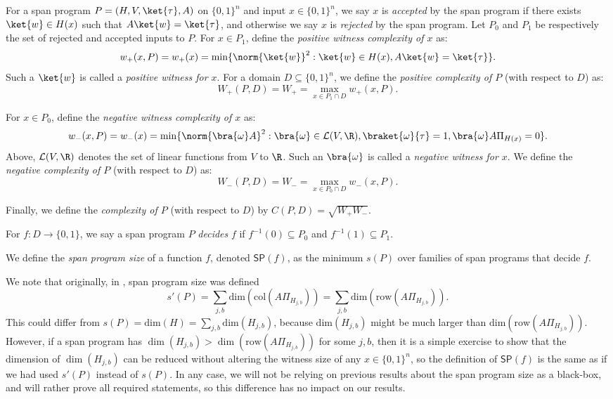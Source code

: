\documentclass{toc}
\begin{document}
\begin{definition}\label{def:witness}
For a span program $P=(H,V,\ket{\tau},A)$ on $\{0,1\}^n$ and input $x\in\{0,1\}^n$, 
we say $x$ is \emph{accepted} by the span program if there exists $\ket{w}\in H(x)$ such that $A\ket{w}=\ket{\tau}$, and otherwise we say $x$ is \emph{rejected} by the span program. Let $P_0$ and $P_1$ be respectively the set of rejected and accepted inputs to $P$. For $x\in P_1$, define the \emph{positive witness complexity of $x$} as:
$$w_+(x,P)=w_+(x)=\min\{\norm{\ket{w}}^2:\ket{w}\in H(x), A\ket{w}=\ket{\tau}\}.$$
Such a $\ket{w}$ is called a \emph{positive witness for $x$}. For a domain $D\subseteq\{0,1\}^n$, we define the \emph{positive complexity of $P$} (with respect to $D$) as:
$$W_+(P,D)=W_+=\max_{x\in P_1\cap D}w_+(x,P).$$

For $x\in P_0$, define the \emph{negative witness complexity of $x$} as:
$$w_-(x,P)=w_-(x)=\min\{\norm{\bra{\omega} A}^2:\bra{\omega}\in{\cal L}(V,\R), \braket{\omega }{\tau}=1,\bra{\omega} A\Pi_{H(x)}=0\}.$$
Above, ${\cal L}(V,\R)$ denotes the set of linear functions from $V$ to $\R$.
Such an $\bra{\omega}$ is called a \emph{negative witness for $x$}. We define the \emph{negative complexity of $P$} (with respect to $D$) as:
$$W_-(P,D)=W_-=\max_{x\in P_0\cap D}w_-(x,P).$$

Finally, we define the \emph{complexity of $P$} (with respect to $D$) by $C(P,D)=\sqrt{W_+W_-}$. 
\end{definition}

For $f:D\rightarrow\{0,1\}$, we say a span program $P$ \emph{decides} $f$ if $f^{-1}(0)\subseteq P_0$ and $f^{-1}(1)\subseteq P_1$. 

\begin{definition}\label{def:SP}
We define the \emph{span program size} of a function $f$, denoted $\mathsf{SP}(f)$, as the minimum $s(P)$ over families of span programs that decide $f$. 
\end{definition}

We note that originally, in \cite{KW93}, span program size was defined 
$$s'(P)=\sum_{j,b}\mathrm{dim}(\mathrm{col}(A\Pi_{H_{j,b}}))=\sum_{j,b}\mathrm{dim}(\mathrm{row}(A\Pi_{H_{j,b}})).$$ 
This could differ from $s(P)=\mathrm{dim}(H)=\sum_{j,b}\mathrm{dim}(H_{j,b})$, because 
$\mathrm{dim}(H_{j,b})$ might be much larger than $\mathrm{dim}(\mathrm{row}(A\Pi_{H_{j,b}}))$. However, if a span program has $\dim(H_{j,b})>\dim(\mathrm{row}(A\Pi_{H_{j,b}}))$ for some $j,b$, then it is a simple exercise to show that the dimension of $\dim(H_{j,b})$ can be reduced without altering the witness size of any $x\in\{0,1\}^n$, so the definition of $\mathsf{SP}(f)$ is the same as if %
we had   %
used $s'(P)$ instead of $s(P)$. In any case, we will not be relying on previous results about the span program size as a black-box, and will rather prove all required statements, so this difference has no impact on our results. 
\end{document}
